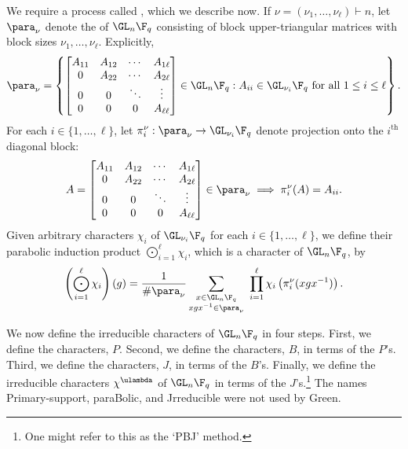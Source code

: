 We require a process called , which we describe now.
If $\nu = (\nu_1,\ldots,\nu_\ell) \vdash n$, let $\para_\nu$ denote the  of $\GL_{n} \F_q$ consisting of block upper-triangular matrices with block sizes $\nu_1, \ldots, \nu_\ell$. Explicitly,
\begin{equation}
\label{para_def}
\para_\nu = \left \{
\begin{bmatrix}
A_{11} & A_{12} & \cdots & A_{1 \ell} \\
0 & A_{22} & \cdots & A_{2 \ell} \\
0 & 0 & \ddots & \vdots \\
0 & 0 & 0 & A_{\ell \ell}
\end{bmatrix} \in \GL_{n} \F_q :
A_{ii} \in \GL_{\nu_i} \F_q \text{ for all } 1 \leq i \leq \ell
\right \}.
\end{equation}
For each $i \in \{1,\ldots,\ell\}$, let $\pi_i^\nu : \para_{\nu} \to \GL_{\nu_i} \F_q$ denote projection
onto the $i^\text{th}$ diagonal block:
\begin{equation}
A = \begin{bmatrix}
A_{11} & A_{12} & \cdots & A_{1 \ell} \\
0 & A_{22} & \cdots & A_{2 \ell} \\
0 & 0 & \ddots & \vdots \\
0 & 0 & 0 & A_{\ell \ell}
\end{bmatrix}
\in \para_\nu
\implies
\pi_i^\nu (A) = A_{ii}.
\end{equation}
Given arbitrary characters $\chi_i$ of $\GL_{\nu_i} \F_q$ for each $i \in \{1,\ldots,\ell\}$,
we define their parabolic induction product $\bigodot_{i = 1}^\ell \chi_i$, which is a character of $\GL_{n} \F_q$, by
\begin{equation} \label{parabolic_induction} \left(\bigodot_{i = 1}^\ell \chi_i \right) (g) = \frac{1}{\# \para_\nu} \sum_{\substack{x \in \GL_{n} \F_q \\ xgx^{-1} \in \para_\nu}} \, \, \prod_{i = 1}^{\ell} \chi_i \left ( \pi^\nu_i ( xgx^{-1} ) \right ). \end{equation}

We now define the irreducible characters of $\GL_n \F_q$ in four steps. First, we define the  characters, $P$.
Second, we define the  characters, $B$, in terms of the $P$'s.
Third, we define the  characters, $J$, in terms of the $B$'s.
Finally, we define the irreducible characters \(\chi^\ulambda\) of \(\GL_n \F_q\) in terms of the $J$'s.\footnote{One might refer to this as the `PBJ' method.}
The names Primary-support, paraBolic, and Jrreducible were not used by Green.

